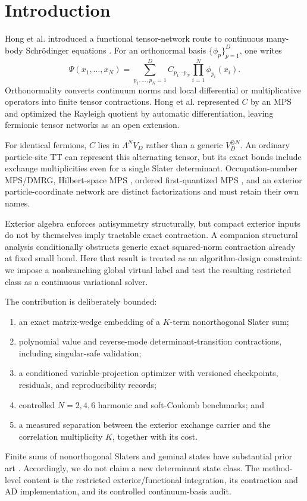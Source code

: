 \documentclass[11pt]{article}
\begin{document}
\section{Introduction}

Hong et al. introduced a functional tensor-network route to continuous
many-body Schr\"odinger equations \cite{Hong2022FunctionalTN}.  For an
orthonormal basis $\{\phi_p\}_{p=1}^{D}$, one writes
\begin{equation}
 \Psi(x_1,\ldots,x_N)=
 \sum_{p_1,\ldots,p_N=1}^{D} C_{p_1\cdots p_N}
 \prod_{i=1}^{N}\phi_{p_i}(x_i).
 \label{eq:functional-expansion}
\end{equation}
Orthonormality converts continuum norms and local differential or
multiplicative operators into finite tensor contractions.  Hong et al.
represented $C$ by an MPS and optimized the Rayleigh quotient by automatic
differentiation, leaving fermionic tensor networks as an open extension.

For identical fermions, $C$ lies in $\Lambda^N V_D$ rather than a generic
$V_D^{\otimes N}$.  An ordinary particle-site TT can represent this alternating
tensor, but its exact bonds include exchange multiplicities even for a single
Slater determinant.  Occupation-number MPS/DMRG, Hilbert-space MPS
\cite{ChanSharma2011DMRG,LiChan2016HSMPS}, ordered first-quantized MPS
\cite{LiWaintal2026FirstQuantization}, and an exterior particle-coordinate
network are distinct factorizations and must retain their own names.

Exterior algebra enforces antisymmetry structurally, but compact exterior
inputs do not by themselves imply tractable exact contraction.  A companion
structural analysis conditionally obstructs generic exact squared-norm
contraction already at fixed small bond.  Here that result is treated as an
algorithm-design constraint: we impose a nonbranching global virtual label and
test the resulting restricted class as a continuous variational solver.

The contribution is deliberately bounded:
\begin{enumerate}
 \item an exact matrix-wedge embedding of a $K$-term nonorthogonal Slater sum;
 \item polynomial value and reverse-mode determinant-transition contractions,
       including singular-safe validation;
 \item a conditioned variable-projection optimizer with versioned checkpoints,
       residuals, and reproducibility records;
 \item controlled $N=2,4,6$ harmonic and soft-Coulomb benchmarks; and
 \item a measured separation between the exterior exchange carrier and the
       correlation multiplicity $K$, together with its cost.
\end{enumerate}
Finite sums of nonorthogonal Slaters and geminal states have substantial prior
art \cite{BeylkinMohlenkampPerez2008SlaterSums,UemuraKasamatsuSugino2015AGPCI}.
Accordingly, we do not claim a new determinant state class.  The method-level
content is the restricted exterior/functional integration, its contraction and
AD implementation, and its controlled continuum-basis audit.
\end{document}

